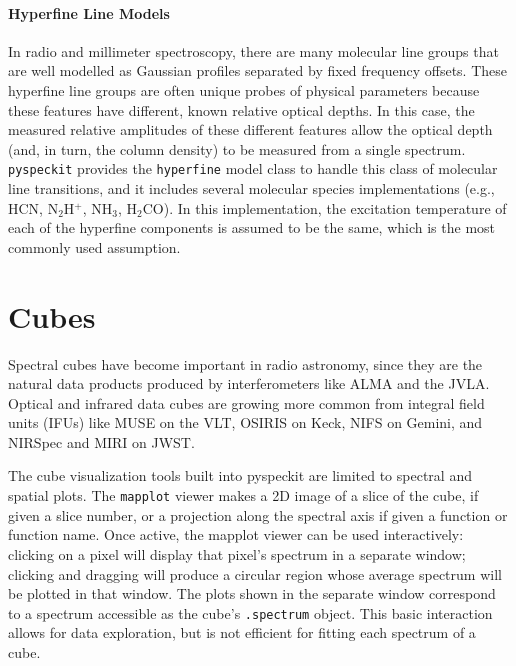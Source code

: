 \documentclass[twocolumn]{aastex63}
\newcommand{\pyspeckit}{\texttt{pyspeckit}\xspace}
\begin{document}

\paragraph{Hyperfine Line Models}
In radio and millimeter spectroscopy, there are many molecular line groups
that are well modelled as Gaussian profiles separated by fixed frequency
offsets.  These hyperfine line groups are often unique probes of physical
parameters because these features have different, known relative optical
depths.  In this case, the measured relative amplitudes of these different
features allow the optical depth (and, in turn, the column density) to be
measured from a single spectrum.  \pyspeckit provides the \texttt{hyperfine}
model class to handle this class of molecular line transitions, and it includes
several molecular species implementations (e.g., HCN, N$_2$H$^+$, NH$_3$, H$_2$CO). 
In this implementation, the excitation temperature of each of the hyperfine components is assumed to be the same, which is the most commonly used assumption.



\section{Cubes}
\label{sec:cubes}
Spectral cubes have become important in radio astronomy, since they are the
natural data products produced by interferometers like ALMA and the JVLA.
Optical and infrared data cubes are growing
more common from integral field units (IFUs) like MUSE on
the VLT, OSIRIS on Keck, NIFS on Gemini, and NIRSpec and MIRI on JWST.

The cube visualization tools built into pyspeckit are limited to spectral and spatial plots.
The \texttt{mapplot} viewer makes a 2D image of a slice of the cube, if given a slice number,
or a projection along the spectral axis if given a function or function name.
Once active, the mapplot viewer can be used interactively: clicking on a pixel
will display that pixel's spectrum in a separate window; clicking and dragging
will produce a circular region whose average spectrum will be plotted in that
window.  The plots shown in the separate window correspond to a spectrum accessible
as the cube's \texttt{.spectrum} object. This basic interaction allows for data exploration,
but is not efficient for fitting each spectrum of a cube.
\end{document}

